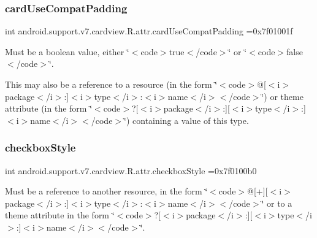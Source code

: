 \subsubsection{\texorpdfstring{card\+Use\+Compat\+Padding}{cardUseCompatPadding}}
{\footnotesize\ttfamily int android.\+support.\+v7.\+cardview.\+R.\+attr.\+card\+Use\+Compat\+Padding =0x7f01001f\hspace{0.3cm}{\ttfamily [static]}}

Must be a boolean value, either \char`\"{}$<$code$>$true$<$/code$>$\char`\"{} or \char`\"{}$<$code$>$false$<$/code$>$\char`\"{}. 

This may also be a reference to a resource (in the form \char`\"{}$<$code$>$@\mbox{[}$<$i$>$package$<$/i$>$\+:\mbox{]}$<$i$>$type$<$/i$>$\+:$<$i$>$name$<$/i$>$$<$/code$>$\char`\"{}) or theme attribute (in the form \char`\"{}$<$code$>$?\mbox{[}$<$i$>$package$<$/i$>$\+:\mbox{]}\mbox{[}$<$i$>$type$<$/i$>$\+:\mbox{]}$<$i$>$name$<$/i$>$$<$/code$>$\char`\"{}) containing a value of this type. \mbox{\label{classandroid_1_1support_1_1v7_1_1cardview_1_1R_1_1attr_a7af958624cb74038f99dd3a6e7a9594f}} 
\subsubsection{\texorpdfstring{checkbox\+Style}{checkboxStyle}}
{\footnotesize\ttfamily int android.\+support.\+v7.\+cardview.\+R.\+attr.\+checkbox\+Style =0x7f0100b0\hspace{0.3cm}{\ttfamily [static]}}

Must be a reference to another resource, in the form \char`\"{}$<$code$>$@\mbox{[}+\mbox{]}\mbox{[}$<$i$>$package$<$/i$>$\+:\mbox{]}$<$i$>$type$<$/i$>$\+:$<$i$>$name$<$/i$>$$<$/code$>$\char`\"{} or to a theme attribute in the form \char`\"{}$<$code$>$?\mbox{[}$<$i$>$package$<$/i$>$\+:\mbox{]}\mbox{[}$<$i$>$type$<$/i$>$\+:\mbox{]}$<$i$>$name$<$/i$>$$<$/code$>$\char`\"{}. \mbox{\label{classandroid_1_1support_1_1v7_1_1cardview_1_1R_1_1attr_a217d182107bfc99ee474dcddb89ab962}} 
